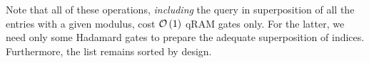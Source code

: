 Note that all of these operations, \emph{including} the query in superposition of all the entries with a given modulus, cost $\mathcal{O} \left(1 \right)$ qRAM gates only. For the latter, we need only some Hadamard gates to prepare the adequate superposition of indices. Furthermore, the list remains sorted by design.








